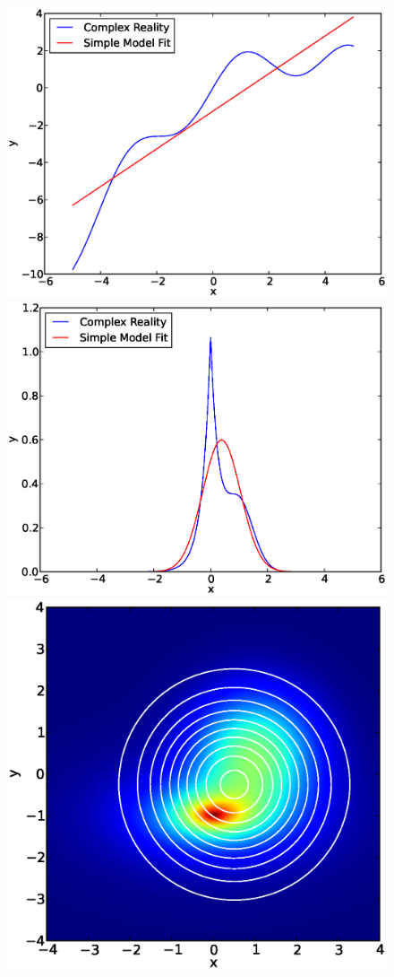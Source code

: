 \documentclass[letterpaper, 11pt]{article}
\begin{document}
\begin{figure}
\begin{center}
\includegraphics[scale=0.25]{simple_complex1.eps}
\includegraphics[scale=0.25]{simple_complex2.eps}
\includegraphics[scale=0.25]{simple_complex3.eps}

\end{center}
\end{figure}
\end{document}
